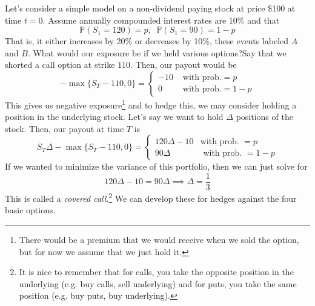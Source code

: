 \documentclass{article}
\begin{document}
    Let's consider a simple model on a non-dividend paying stock at price \$100 at time $t = 0$. Assume annually compounded interest rates are 10\% and that 
    \begin{equation}
      \mathbb{P}(S_1 = 120) = p, \;\; \mathbb{P}(S_1 = 90) = 1 - p
    \end{equation}
    That is, it either increases by 20\% or decreases by 10\%, these events labeled $A$ and $B$. What would our exposure be if we held various options?Say that we shorted a call option at strike $110$. Then, our payout would be 
    \begin{equation}
      - \max\{ S_T - 110, 0 \} = \begin{cases} 
        -10 & \text{ with prob.} = p \\ 
        0 & \text{ with prob.} = 1 - p 
      \end{cases}
    \end{equation}
    This gives us negative exposure\footnote{There would be a premium that we would receive when we sold the option, but for now we assume that we just hold it. } and to hedge this, we may consider holding a position in the underlying stock. Let's say we want to hold $\Delta$ positions of the stock. Then, our payout at time $T$ is 
    \begin{equation}
      S_T \Delta - \max\{S_T - 110, 0\} = \begin{cases} 
        120 \Delta - 10 & \text{with prob. } = p  \\ 
        90\Delta & \text{ with prob. } = 1 - p
      \end{cases} 
    \end{equation}
    If we wanted to minimize the variance of this portfolio, then we can just solve for 
    \begin{equation}
      120 \Delta - 10 = 90 \Delta \implies \Delta = \frac{1}{3} 
    \end{equation}
    This is called a \textit{covered call}.\footnote{It is nice to remember that for calls, you take the opposite position in the underlying (e.g. buy calls, sell underlying) and for puts, you take the same position (e.g. buy puts, buy underlying). } We can develop these for hedges against the four basic options. 
\end{document}
